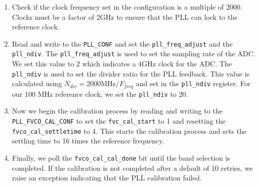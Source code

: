 \begin{enumerate}
    \item 
        Check if the clock frequency set in the configuration is a multiple of 2000. 
        Clocks must be a factor of 2GHz to ensure that the PLL can lock to the reference clock.
    \item 
        Read and write to the \texttt{PLL\_CONF} and set the \texttt{pll\_freq\_adjust} and the \texttt{pll\_ndiv}. 
        The \texttt{pll\_freq\_adjust} is used to set the sampling rate of the ADC. 
        We set this value to 2 which indicates a 4GHz clock for the ADC. 
        The \texttt{pll\_ndiv} is used to set the divider ratio for the PLL feedback. 
        This value is calculated using $N_{div} = 2000 \text{MHz} / F_{freq}$ and set in the \texttt{pll\_ndiv} register. 
        For our 100 MHz reference clock, we set the \texttt{pll\_ndiv} to 20.
    \item 
        Now we begin the calibration process by reading and writing to the \texttt{PLL\_FVCO\_CAL\_CONF} to set the \texttt{fvc\_cal\_start} to 1 and resetting the \texttt{fvco\_cal\_settletime} to 4. 
        This starts the calibration process and sets the settling time to 16 times the reference frequency.
    \item 
        Finally, we poll the \texttt{fvco\_cal\_cal\_done} bit until the band selection is completed. 
        If the calibration is not completed after a default of 10 retries, we raise an exception indicating that the PLL calibration failed.
\end{enumerate}

